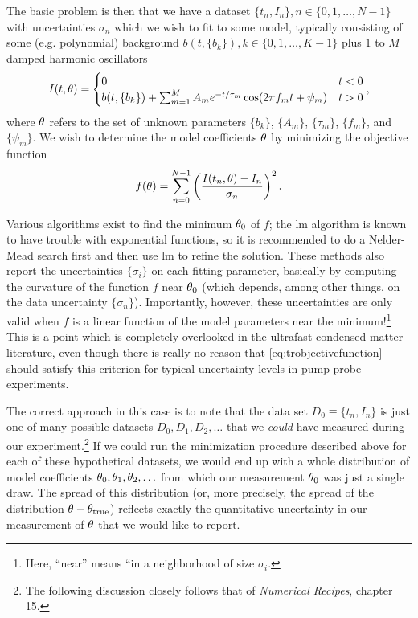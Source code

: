 The basic problem is then that we have a dataset $\{t_n, I_n\}, n\in \{0, 1, \ldots, N-1\}$ with uncertainties $\sigma_n$ which we wish to fit to some model, typically consisting of some (e.g. polynomial) background $b(t, \{b_k\}), k\in\{0, 1, \ldots, K-1\}$ plus $1$ to $M$ damped harmonic oscillators
\begin{equation}
I(t, \theta) = \begin{cases}
0 & t<0\\
b(t, \{b_k\})+\sum_{m=1}^M A_m e^{-t/\tau_m} \cos (2\pi f_m t + \psi_m) & t>0
\end{cases},
\end{equation}
where $\theta$ refers to the set of unknown parameters $\{b_k\}$, $\{A_m\}$, $\{\tau_m\}$, $\{f_m\}$, and $\{\psi_m\}$.
We wish to determine the model coefficients $\theta$ by minimizing the objective function
\begin{equation}\label{eq:trobjectivefunction}
f(\theta) = \sum_{n=0}^{N-1}\left(\frac{I(t_n, \theta)-I_n}{\sigma_n}\right)^2.
\end{equation}

Various algorithms exist to find the minimum $\theta_0$ of $f$; the \gls{lm} algorithm \citep{levenberg_method_1944,marquardt_algorithm_1963} is known to have trouble with exponential functions, so it is recommended to do a Nelder-Mead search \citep{nelder_simplex_1965} first and then use \gls{lm} to refine the solution.
These methods also report the uncertainties $\{\sigma_i\}$ on each fitting parameter, basically by computing the curvature of the function $f$ near $\theta_0$ (which depends, among other things, on the data uncertainty $\{\sigma_n\}$).
Importantly, however, these uncertainties are only valid when $f$ is a linear function of the model parameters near the minimum!\footnote{Here, ``near'' means ``in a neighborhood of size $\sigma_i$.}
This is a point which is completely overlooked in the ultrafast condensed matter literature, even though there is really no reason that \cref{eq:trobjectivefunction} should satisfy this criterion for typical uncertainty levels in pump-probe experiments.

The correct approach in this case is to note that the data set $D_0 \equiv \{t_n, I_n\}$ is just one of many possible datasets $D_0, D_1, D_2, \ldots$ that we \emph{could} have measured during our experiment.\footnote{The following discussion closely follows that of \textit{Numerical Recipes}, chapter 15\citep{numericalrecipes}.}
If we could run the minimization procedure described above for each of these hypothetical datasets, we would end up with a whole distribution of model coefficients $\theta_0, \theta_1, \theta_2, \ldots$ from which our measurement $\theta_0$ was just a single draw.
The spread of this distribution (or, more precisely, the spread of the distribution $\theta-\theta_\mathrm{true}$) reflects exactly the quantitative uncertainty in our measurement of $\theta$ that we would like to report.


